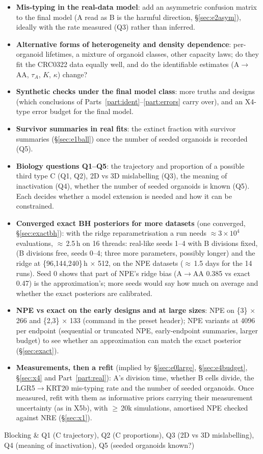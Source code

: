 \documentclass[10pt,a4paper]{article}
\makeatletter
\newcommand{\tA}{$\tau_A$}
\newcommand{\code}[1]{\texttt{\detokenize{#1}}}
\newcommand{\blk}[1]{\par\needspace{5\baselineskip}\smallskip{\sffamily\bfseries\color{inkgray}#1}\par}
\newcommand{\Setup}{\blk{Setup}}
\newenvironment{setup}{\par\footnotesize\noindent\tabularx{\linewidth}{@{}>{\bfseries\raggedright}p{2.85cm}Y@{}}\toprule}{\bottomrule\endtabularx\par}
\renewcommand{\blk}[1]{\par\Needspace*{5\baselineskip}\smallskip{\sffamily\bfseries\color{inkgray}#1}\par}
\newcommand{\sref}[1]{\S\ref{#1}}
\makeatother
\begin{document}
\begin{itemize}
\item \textbf{Mis-typing in the real-data model}: add an asymmetric confusion matrix to the final model (A read as B is the harmful direction, \sref{sec:e2asym}), ideally with the rate measured (Q3) rather than inferred.
\item \textbf{Alternative forms of heterogeneity and density dependence}: per-organoid lifetimes, a mixture of organoid classes, other capacity laws; do they fit the CRC0322 data equally well, and do the identifiable estimates (A$\to$AA, \tA, $K$, $\kappa$) change?
\item \textbf{Synthetic checks under the final model class}: more truths and designs (which conclusions of Parts~\ref{part:ident}--\ref{part:errors} carry over), and an X4-type error budget for the final model.
\item \textbf{Survivor summaries in real fits}: the extinct fraction with survivor summaries (\sref{sec:e1ball}) once the number of seeded organoids is recorded (Q5).
\item \textbf{Biology questions Q1--Q5}: the trajectory and proportion of a possible third type C (Q1, Q2), 2D vs 3D mislabelling (Q3), the meaning of inactivation (Q4), whether the number of seeded organoids is known (Q5). Each decides whether a model extension is needed and how it can be constrained.
\item \textbf{Converged exact BH posteriors for more datasets} (one converged, \sref{sec:exactbh}): with the ridge reparametrisation a run needs $\approx 3\times10^4$ evaluations, $\approx$\,2.5\,h on 16 threads: real-like seeds 1--4 with B divisions fixed, \code{two_type} (B divisions free, seeds 0--4; three more parameters, possibly longer) and the ridge at \{96,144,240\}\,h $\times$ 512, on the NPE datasets ($\approx$\,1.5 days for the 14 runs). Seed 0 shows that part of NPE's ridge bias (A$\to$AA 0.385 vs exact 0.47) is the approximation's; more seeds would say how much on average and whether the exact posteriors are calibrated.
\item \textbf{NPE vs exact on the early designs and at large sizes}: NPE on \{3\} $\times$ 266 and \{2,3\} $\times$ 133 (command in the \code{exact_gw_early} preset header); NPE variants at 4096 per endpoint (sequential or truncated NPE, early-endpoint summaries, larger budget) to see whether an approximation can match the exact posterior (\sref{sec:exact}).
\item \textbf{Measurements, then a refit} (implied by \sref{sec:e0large}, \sref{sec:e4budget}, \sref{sec:x4} and Part~\ref{part:real}): A's division time, whether B cells divide, the LGR5$\to$KRT20 mis-typing rate and the number of seeded organoids. Once measured, refit with them as informative priors carrying their measurement uncertainty (as in X5b), with $\ge$\,20k simulations, amortised NPE checked against NRE (\sref{sec:x1}).
\end{itemize}
\Setup
\begin{setup}
Blocking & Q1 (C trajectory), Q2 (C proportions), Q3 (2D vs 3D mislabelling), Q4 (meaning of inactivation), Q5 (seeded organoids known?) \\
\end{setup}
\end{document}
